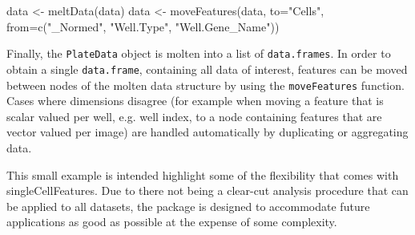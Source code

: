 \begin{rflow}
data <- meltData(data)
data <- moveFeatures(data, to="Cells",
                     from=c("_Normed", "Well.Type", "Well.Gene_Name"))

\end{rflow}


Finally, the \texttt{PlateData} object is molten into a list of \texttt{data.frames}. In order to obtain a single \texttt{data.frame}, containing all data of interest, features can be moved between nodes of the molten data structure by using the \texttt{moveFeatures} function. Cases where dimensions disagree (for example when moving a feature that is scalar valued per well, e.g. well index, to a node containing features that are vector valued per image) are handled automatically by duplicating or aggregating data.

This small example is intended highlight some of the flexibility that comes with singleCellFeatures. Due to there not being a clear-cut analysis procedure that can be applied to all datasets, the package is designed to accommodate future applications as good as possible at the expense of some complexity.
